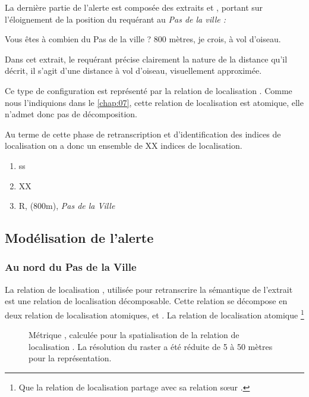La dernière partie de l'alerte est composée des extraits  et
, portant sur l'éloignement de la position du requérant au
\emph{Pas de la ville :}
%
\begin{dialogue}
  \Sec {} Vous êtes à combien du Pas de la ville ?
  \Req {}  800 mètres, je crois, à vol d'oiseau.
\end{dialogue}
%
Dans cet extrait, le requérant précise clairement la nature de la
distance qu'il décrit, il s'agit d'une distance à vol d'oiseau,
visuellement approximée.

Ce type de configuration est représenté par la relation de
localisation
. Comme nous
l'indiquions dans le \autoref{chap:07}, cette relation de localisation
est atomique, elle n'admet donc pas de décomposition.

%
Au terme de cette phase de retranscription et d'identification des
indices de localisation on a donc un ensemble de XX indices de
localisation.
%
\begin{enumerate}
\item ss
\item XX
\item R, (800m), \emph{Pas de la Ville}
\end{enumerate}


\subsection{Modélisation de l'alerte}
\label{subsec:9-2-2}




\subsubsection{Au nord du Pas de la Ville}

La relation de localisation ,
utilisée pour retranscrire la sémantique de l'extrait  est
une relation de localisation décomposable.
%
Cette relation se décompose en deux relation de localisation
atomiques,  et
. La relation de localisation
atomique  \footnote{Que la relation de
  localisation \protect{} partage avec
  sa relation sœur \protect{}.}


\begin{figure}
  \centering
  
  \caption{Métrique \protect{}, calculée
    pour la spatialisation de la relation de localisation
    \protect{}. La résolution du raster a
    été réduite de 5 à 50 mètres pour la représentation.}
  \label{fig:veyont_EcartNord}
\end{figure}


